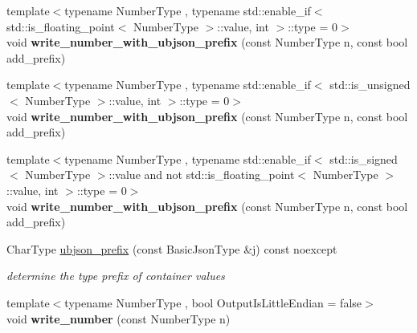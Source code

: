 \begin{DoxyCompactItemize}
{\footnotesize template$<$typename Number\+Type , typename std\+::enable\+\_\+if$<$ std\+::is\+\_\+floating\+\_\+point$<$ Number\+Type $>$\+::value, int $>$\+::type  = 0$>$ }\\void {\bfseries write\+\_\+number\+\_\+with\+\_\+ubjson\+\_\+prefix} (const Number\+Type n, const bool add\+\_\+prefix)
\item 
\mbox{\label{classnlohmann_1_1detail_1_1binary__writer_a0ea6745f944c0c61672146886b4ee90f}} 
{\footnotesize template$<$typename Number\+Type , typename std\+::enable\+\_\+if$<$ std\+::is\+\_\+unsigned$<$ Number\+Type $>$\+::value, int $>$\+::type  = 0$>$ }\\void {\bfseries write\+\_\+number\+\_\+with\+\_\+ubjson\+\_\+prefix} (const Number\+Type n, const bool add\+\_\+prefix)
\item 
\mbox{\label{classnlohmann_1_1detail_1_1binary__writer_a0ea6745f944c0c61672146886b4ee90f}} 
{\footnotesize template$<$typename Number\+Type , typename std\+::enable\+\_\+if$<$ std\+::is\+\_\+signed$<$ Number\+Type $>$\+::value and not std\+::is\+\_\+floating\+\_\+point$<$ Number\+Type $>$\+::value, int $>$\+::type  = 0$>$ }\\void {\bfseries write\+\_\+number\+\_\+with\+\_\+ubjson\+\_\+prefix} (const Number\+Type n, const bool add\+\_\+prefix)
\item 
Char\+Type \mbox{\hyperlink{classnlohmann_1_1detail_1_1binary__writer_a4c129249a5aee8e4ec8add6c6184e4f7}{ubjson\+\_\+prefix}} (const Basic\+Json\+Type \&j) const noexcept
\begin{DoxyCompactList}\small\item\em determine the type prefix of container values \end{DoxyCompactList}\item 
\mbox{\label{classnlohmann_1_1detail_1_1binary__writer_a6e11b7227fcecc25a548ed45507b7d1c}} 
{\footnotesize template$<$typename Number\+Type , bool Output\+Is\+Little\+Endian = false$>$ }\\void {\bfseries write\+\_\+number} (const Number\+Type n)
\end{DoxyCompactItemize}
